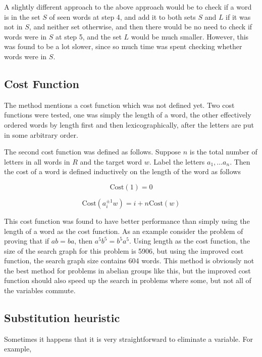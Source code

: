 \documentclass[11pt]{article} %
\theoremstyle{definition}
\theoremstyle{definition}
\theoremstyle{definition}
\theoremstyle{definition}
\theoremstyle{definition}
\theoremstyle{definition}
\begin{document}
A slightly different approach to the above approach would be to check if
a word is in the set $S$ of seen words at step 4, and add it to both sets $S$ and $L$
if it was not in $S$, and neither set otherwise, and then there would be no need to check
if words were in $S$ at step 5, and the set $L$ would be much smaller. However, this was
found to be a lot slower, since so much time was spent checking whether words were in $S$.

\subsection{Cost Function}

The method mentions a cost function which was not defined yet. Two cost functions
were tested, one was simply the length of a word, the other effectively ordered words
by length first and then lexicographically, after the letters are put in some arbitrary order.

The second cost function was defined as follows. Suppose $n$ is the total number of
letters in all words in $R$ and the target word $w$.
Label the letters $a_1, \dots a_n$. Then the cost of a word is defined inductively on the
length of the word as follows

\begin{equation}
  \text{Cost}(1) = 0
\end{equation}

\begin{equation}
  \text{Cost}(a_i^{\pm1} w) = i + n \text{Cost}(w)
\end{equation}


This cost function was found to have better performance than simply using the length of a word
as the cost function. As an example consider the problem of proving that
if $ab = ba$, then $a^5b^5=b^5a^5$. Using length as the cost function, the size
of the search graph for this problem is 5906, but using the improved cost function,
the search graph size contains 604 words. This method is obviously not the
best method for problems in abelian groups like this, but the improved cost
function should also speed up the search in problems where some, but not all
of the variables commute.

\subsection{Substitution heuristic}
Sometimes it happens that it is very straightforward to eliminate a variable. For example,
\end{document}
